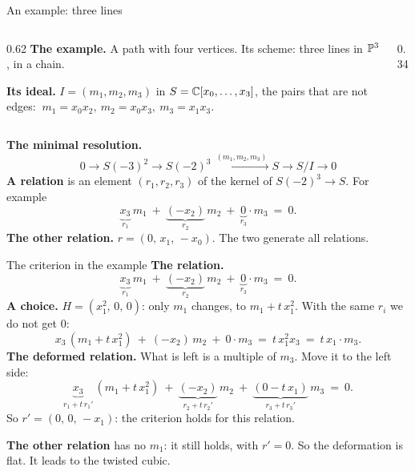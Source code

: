 \begin{frame}{An example: three lines}
\begin{columns}[c]
\begin{column}{0.62\textwidth}
\textbf{The example.} A path with four vertices. Its scheme: three lines in \(\mathbb P^3\), in a chain.
\par
\textbf{Its ideal.} \(I=(m_1,m_2,m_3)\) in \(S=\mathbb C[x_0,\dots,x_3]\), the pairs that are not edges: \(\ m_1=x_0x_2,\ m_2=x_0x_3,\ m_3=x_1x_3\).
\end{column}
\begin{column}{0.34\textwidth}\centering
{}
\end{column}
\end{columns}
\par
\textbf{The minimal resolution.}
\[
0\longrightarrow S(-3)^{2}\longrightarrow S(-2)^{3}\xrightarrow{\ (m_1,m_2,m_3)\ }S\longrightarrow S/I\longrightarrow0
\]
\textbf{A relation} is an element \((r_1,r_2,r_3)\) of the kernel of \(S(-2)^3\to S\). For example
\[
\underbrace{x_3}_{r_1}\,m_1\ +\ \underbrace{(-x_2)}_{r_2}\,m_2\ +\ \underbrace{0}_{r_3}\cdot m_3\ =\ 0.
\]
\textbf{The other relation.} \(r=(0,\,x_1,\,-x_0)\). The two generate all relations.
\end{frame}

\begin{frame}{The criterion in the example}
\textbf{The relation.}
\[
\underbrace{x_3}_{r_1}\,m_1\ +\ \underbrace{(-x_2)}_{r_2}\,m_2\ +\ \underbrace{0}_{r_3}\cdot m_3\ =\ 0.
\]
\textbf{A choice.} \(H=(x_1^2,\,0,\,0)\): only \(m_1\) changes, to \(m_1+t\,x_1^2\). With the same \(r_i\) we do not get \(0\):
\[
x_3\,(m_1+t\,x_1^2)\ +\ (-x_2)\,m_2\ +\ 0\cdot m_3\ =\ t\,x_1^2x_3\ =\ t\,x_1\cdot m_3.
\]
\textbf{The deformed relation.} What is left is a multiple of \(m_3\). Move it to the left side:
\[
\underbrace{x_3}_{r_1+t\,r_1'}\,(m_1+t\,x_1^2)\ +\ \underbrace{(-x_2)}_{r_2+t\,r_2'}\,m_2\ +\ \underbrace{(0-t\,x_1)}_{r_3+t\,r_3'}\,m_3\ =\ 0.
\]
So \(r'=(0,\,0,\,-x_1)\): the criterion holds for this relation.
\par
\textbf{The other relation} has no \(m_1\): it still holds, with \(r'=0\). So the deformation is flat. It leads to the twisted cubic.
\end{frame}

